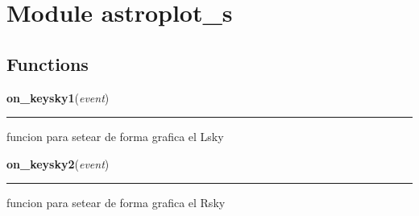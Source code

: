 %
%
%


\section{Module astroplot\_s}

    \label{astroplot_s}


  \subsection{Functions}

    \label{astroplot_s:on_keysky1}

    \vspace{0.5ex}

\hspace{.8\funcindent}\begin{boxedminipage}{\funcwidth}

    \raggedright \textbf{on\_keysky1}(\textit{event})

    \vspace{-1.5ex}

    \rule{\textwidth}{0.5\fboxrule}
\setlength{\parskip}{2ex}
    funcion para setear de forma grafica el Lsky

\setlength{\parskip}{1ex}
    \end{boxedminipage}

    \label{astroplot_s:on_keysky2}

    \vspace{0.5ex}

\hspace{.8\funcindent}\begin{boxedminipage}{\funcwidth}

    \raggedright \textbf{on\_keysky2}(\textit{event})

    \vspace{-1.5ex}

    \rule{\textwidth}{0.5\fboxrule}
\setlength{\parskip}{2ex}
    funcion para setear de forma grafica el Rsky

\setlength{\parskip}{1ex}
    \end{boxedminipage}

